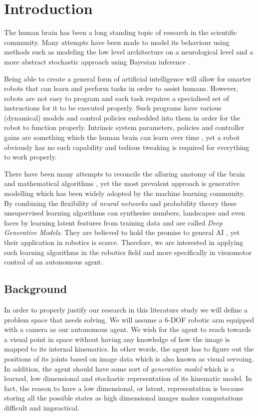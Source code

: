 \documentclass[main.tex]{subfiles}
\begin{document}
\sloppy
\chapter{Introduction}

The human brain has been a long standing topic of research in the scientific community. Many attempts have been made to model its behaviour using methods such as modeling the low level architecture on a neurological level \cite{frank1957perceptron} and a more abstract stochastic approach using  Bayesian inference \cite{bourlard1988auto} .

Being able to create a general form of artificial intelligence will allow for smarter robots that can learn and perform tasks in order to assist humans. However, robots are not easy to program and each task requires a specialised set of instructions for it to be executed properly. Such programs have various (dynamical) models and control policies embedded into them in order for the robot to function properly. Intrinsic system parameters, policies and controller gains are something which the human brain can learn over time \cite{friston2010free,knill2004bayesian, kawato1999internal}, yet a robot obviously has no such capability and tedious tweaking is required for everything to work properly.

There have been many attempts to reconcile the alluring anatomy of the brain and mathematical algorithms \cite{friston2003learning}, yet the most prevalent approach is generative modelling which has been widely adopted by the machine learning community. By combining the flexibility of \textit{neural networks} and probability theory these unsupervised learning algorithms can synthesise numbers, landscapes and even faces by learning latent features from training data and are called \textit{Deep Generative Models}. They are believed to hold the promise to general AI \cite{Goodfellow-et-al-2016}, yet  their application in robotics is scarce. Therefore, we are interested in applying such learning algorithms in the robotics field and more specifically in visuomotor control of an autonomous agent.

\section{Background}
In order to properly justify our research in this literature study we will define a problem space that needs solving. We will assume a 6-DOF robotic arm equipped with a camera as our autonomous agent. We wish for the agent to reach towards a visual point in space without having any knowledge of how the image is mapped to its internal kinematics. In other words, the agent has to figure out the positions of its joints based on image data which is also known as visual servoing. In addition, the agent should have some sort of \textit{generative model} which is a learned, low dimensional and stochastic representation of its kinematic model. In fact, the reason to have a low dimensional, or latent, representation is because storing all the possible states as high dimensional images makes computations difficult and impractical. 
\end{document}

